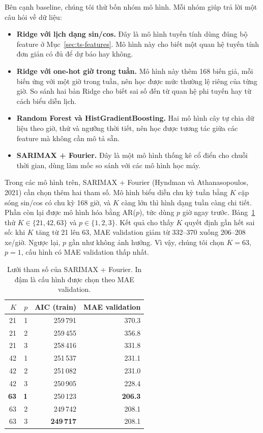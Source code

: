 Bên cạnh baseline, chúng tôi thử bốn nhóm mô hình. Mỗi nhóm giúp trả lời một câu hỏi về dữ liệu:
\begin{itemize}[leftmargin=1.5cm]
    \item \textbf{Ridge với lịch dạng sin/cos.} Đây là mô hình tuyến tính dùng đúng bộ feature ở Mục~\ref{sec:ts-features}. Mô hình này cho
          biết một quan hệ tuyến tính đơn giản có đủ để dự báo hay không.
    \item \textbf{Ridge với one-hot giờ trong tuần.} Mô hình này thêm 168 biến giả, mỗi biến ứng với một giờ trong tuần, nên học được mức
          thường lệ riêng của từng giờ. So sánh hai bản Ridge cho biết sai số đến từ quan hệ phi tuyến hay từ cách biểu diễn lịch.
    \item \textbf{Random Forest và HistGradientBoosting.} Hai mô hình cây tự chia dữ liệu theo giờ, thứ và ngưỡng thời tiết, nên học được
          tương tác giữa các feature mà không cần mô tả sẵn.
    \item \textbf{SARIMAX + Fourier.} Đây là một mô hình thống kê cổ điển cho chuỗi thời gian, dùng làm mốc so sánh với các mô hình học máy.
\end{itemize}

Trong các mô hình trên, SARIMAX + Fourier (Hyndman và Athanasopoulos, 2021) cần chọn thêm hai tham số. Mô hình biểu diễn chu kỳ tuần bằng
$K$ cặp sóng sin/cos có chu kỳ 168 giờ, và $K$ càng lớn thì hình dạng tuần càng chi tiết. Phần còn lại được mô hình hóa bằng AR($p$), tức
dùng $p$ giờ ngay trước. Bảng~\ref{tab:ts-sarimax} thử $K \in \{21, 42, 63\}$ và $p \in \{1, 2, 3\}$. Kết quả cho thấy $K$ quyết định gần hết
sai số: khi $K$ tăng từ 21 lên 63, MAE validation giảm từ 332--370 xuống 206--208 xe/giờ. Ngược lại, $p$ gần như không ảnh hưởng. Vì vậy,
chúng tôi chọn $K = 63$, $p = 1$, cấu hình có MAE validation thấp nhất.

\begin{table}[H]
\centering
\caption{Lưới tham số của SARIMAX + Fourier. In đậm là cấu hình được chọn theo MAE validation.}
\label{tab:ts-sarimax}
\small
\begin{tabular}{rrrr}
\toprule
$K$ & $p$ & AIC (train) & MAE validation\\
\midrule
21 & 1 & 259\,791 & 370.3\\
21 & 2 & 259\,455 & 356.8\\
21 & 3 & 258\,416 & 331.8\\
42 & 1 & 251\,537 & 231.1\\
42 & 2 & 251\,082 & 231.0\\
42 & 3 & 250\,905 & 228.4\\
\textbf{63} & \textbf{1} & 250\,123 & \textbf{206.3}\\
63 & 2 & 249\,742 & 208.1\\
63 & 3 & \textbf{249\,717} & 208.1\\
\bottomrule
\end{tabular}
\end{table}

